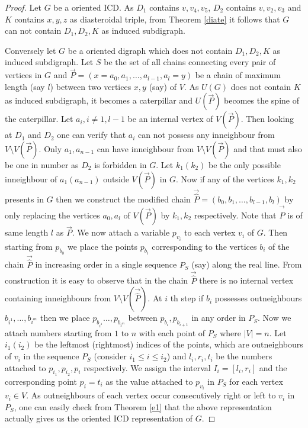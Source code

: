 \documentclass{article}
\theoremstyle{definition}
\numberwithin{equation}{section}
\begin{document}
\begin{proof}
Let $G$ be a oriented ICD. As $D_{1}$ contains $v,v_{4},v_{5}$, $D_{2}$ contains $v,v_{2},v_{3}$ and $K$ contains $x,y,z$ as diasteroidal triple,
from Theorem \ref{diate} it follows that $G$ can not contain $D_{1},D_{2},K$ as induced subdigraph.

\noindent Conversely let $G$ be a oriented digraph which does not contain $D_{1}, D_{2},K$ as induced subdigraph. Let $S$ be the set of all chains connecting every pair of vertices in $G$ and $\vec{P}=(x=a_{0},a_{1},\hdots, a_{l-1},a_{l}=y)$ be a chain of maximum length (say $l$) between two vertices $x,y$ (say) of $V$.
As $U(G)$ does not contain $K$ as induced subdigraph, it becomes a caterpillar and $U(\vec{P})$ becomes the spine of the caterpillar. Let $a_{i}, i\neq 1,l-1$ be an internal vertex of $V(\vec{P})$. Then looking at $D_{1}$ and $D_{2}$ one can verify that $a_{i}$ can not possess any inneighbour from $V\setminus V(\vec{P})$.
 Only $a_{1},a_{n-1}$ can have inneighbour from $V\setminus V(\vec{P})$ and that must also be one in number as $D_{2}$ is forbidden in $G$. Let $k_{1}(k_{2})$ be the only  possible inneighbour of $a_{1}(a_{n-1})$ outside $V(\vec{P})$ in $G$.
Now if any of the vertices $k_{1},k_{2}$ presents in $G$ then we 
construct the modified chain $\vec{\hat{P}}=(b_{0},b_{1},\hdots, b_{l-1},b_{l})$ by only replacing the vertices $a_{0},a_{l}$ of $V(\vec{P})$ by $k_{1},k_{2}$ respectively. Note that $\vec{\hat{P}}$ is of same length $l$ as $\vec{P}$. 
We now attach a variable $p_{v_{i}}$ to each vertex $v_{i}$ of $G$. Then starting from $p_{b_{0}}$ we place the points $p_{b_{i}}$ corresponding to the vertices $b_{i}$ of the chain $\vec{\hat{P}}$ in increasing order in a single sequence $P_{S}$ (say) along the real line.  From construction it is easy to observe that in the chain $\vec{\hat{P}}$ there is no internal vertex containing inneighbours from $V\setminus V(\vec{\hat{P}})$.  At $i$ th step if $b_{i}$ possesses outneighbours $b_{{i}^{1}}, \hdots, b_{i^{m}}$ then we place $p_{b_{{i}^{1}}} \hdots, p_{b_{i^{m}}}$ between $p_{b_{i}},p_{b_{i+1}}$ in any order in $P_{S}$. Now we attach numbers starting from $1$ to $n$ with each point of $P_{S}$ where $|V|=n$. Let $i_{1}(i_{2})$ be the leftmost (rightmost) indices of the points, which are outneighbours of $v_{i}$ in the sequence $P_{S}$ (consider $i_{1}\leq i \leq i_{2}$) and $l_{i},r_{i},t_{i}$ be the numbers attached to $p_{i_{1}},p_{i_{2}},p_{i}$ respectively. We assign the interval $I_{i}=[l_{i},r_{i}]$ and the corresponding point $p_{i}=t_{i}$ as the value attached to $p_{v_{i}}$ in $P_{S}$ for each vertex $v_{i}\in V$. As outneighbours of each vertex occur consecutively right or left to $v_{i}$ in $P_{S}$, one can easily check from Theorem \ref{e1} that the above representation actually gives us the oriented ICD representation of $G$.
\end{proof}
\end{document}
